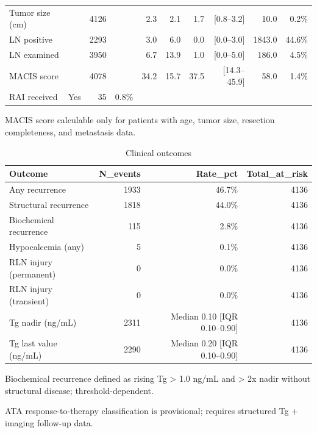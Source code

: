 \begin{table}[htbp]
\begin{tabular}{lrrrrrrrrr}
Tumor size (cm) &  & 4126 &  & 2.3 & 2.1 & 1.7 & [0.8--3.2] & 10.0 & 0.2\% \\
LN positive &  & 2293 &  & 3.0 & 6.0 & 0.0 & [0.0--3.0] & 1843.0 & 44.6\% \\
LN examined &  & 3950 &  & 6.7 & 13.9 & 1.0 & [0.0--5.0] & 186.0 & 4.5\% \\
MACIS score &  & 4078 &  & 34.2 & 15.7 & 37.5 & [14.3--45.9] & 58.0 & 1.4\% \\
RAI received & Yes & 35 & 0.8\% &  &  &  &  &  &  \\
\bottomrule
\end{tabular}
\begin{tablenotes}\footnotesize
\item[1] MACIS score calculable only for patients with age, tumor size, resection completeness, and metastasis data.
\end{tablenotes}
\end{table}

\begin{table}[htbp]
\centering
\caption{Clinical outcomes}
\label{tab:outcomes}
\begin{tabular}{lrrr}
\toprule
Outcome & N\_events & Rate\_pct & Total\_at\_risk \\
\midrule
Any recurrence & 1933 & 46.7\% & 4136 \\
Structural recurrence & 1818 & 44.0\% & 4136 \\
Biochemical recurrence & 115 & 2.8\% & 4136 \\
Hypocalcemia (any) & 5 & 0.1\% & 4136 \\
RLN injury (permanent) & 0 & 0.0\% & 4136 \\
RLN injury (transient) & 0 & 0.0\% & 4136 \\
Tg nadir (ng/mL) & 2311 & Median 0.10 [IQR 0.10--0.90] & 4136 \\
Tg last value (ng/mL) & 2290 & Median 0.20 [IQR 0.10--0.90] & 4136 \\
\bottomrule
\end{tabular}
\begin{tablenotes}\footnotesize
\item[1] Biochemical recurrence defined as rising Tg > 1.0 ng/mL and > 2x nadir without structural disease; threshold-dependent.
\item[2] ATA response-to-therapy classification is provisional; requires structured Tg + imaging follow-up data.
\end{tablenotes}
\end{table}

